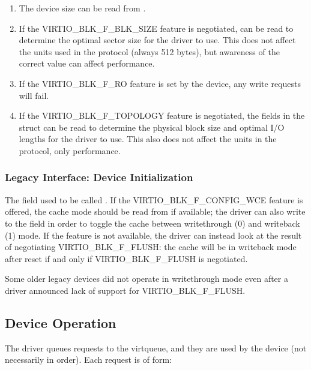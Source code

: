 \begin{enumerate}
\item The device size can be read from .

\item If the VIRTIO_BLK_F_BLK_SIZE feature is negotiated,
   can be read to determine the optimal sector size
  for the driver to use. This does not affect the units used in
  the protocol (always 512 bytes), but awareness of the correct
  value can affect performance.

\item If the VIRTIO_BLK_F_RO feature is set by the device, any write
  requests will fail.

\item If the VIRTIO_BLK_F_TOPOLOGY feature is negotiated, the fields in the
   struct can be read to determine the physical block size and optimal
  I/O lengths for the driver to use. This also does not affect the units
  in the protocol, only performance.
\end{enumerate}

\subsubsection{Legacy Interface: Device Initialization}\label{sec:Device Types / Block Device / Device Initialization / Legacy Interface: Device Initialization}

The  field used to be called .  If the
VIRTIO_BLK_F_CONFIG_WCE feature is offered, the cache mode should be
read from  if available; the
driver can also write to the field in order to toggle the cache
between writethrough (0) and writeback (1) mode.  If the feature is
not available, the driver can instead look at the result of
negotiating VIRTIO_BLK_F_FLUSH: the cache will be in writeback mode
after reset if and only if VIRTIO_BLK_F_FLUSH is negotiated.

Some older legacy devices did not operate in writethrough mode even
after a driver announced lack of support for VIRTIO_BLK_F_FLUSH.

\subsection{Device Operation}\label{sec:Device Types / Block Device / Device Operation}

The driver queues requests to the virtqueue, and they are used by
the device (not necessarily in order). Each request is of form:

